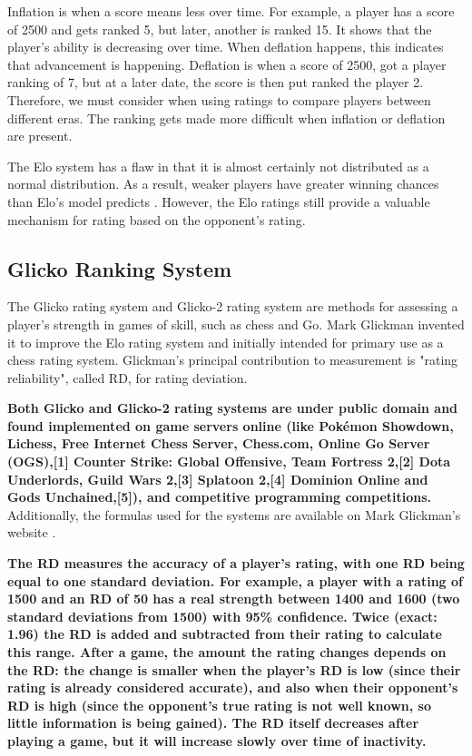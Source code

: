 	
	Inflation is when a score means less over time. For example, a player has a score of 2500 and gets ranked 5, but later, another is ranked 15. It shows that the player's ability is decreasing over time. When deflation happens, this indicates that advancement is happening. Deflation is when a score of 2500, got a player ranking of 7, but at a later date, the score is then put ranked the player 2. Therefore, we must consider when using ratings to compare players between different eras. The ranking gets made more difficult when inflation or deflation are present. %
	
	The Elo system has a flaw in that it is almost certainly not distributed as a normal distribution. As a result, weaker players have greater winning chances than Elo's model predicts \cite{weng2011bayesian}. However, the Elo ratings still provide a valuable mechanism for rating based on the opponent's rating.
	
	\subsection{Glicko Ranking System}
	The Glicko rating system \cite{glickman1995glicko} and Glicko-2 rating system \cite{glickman2012example} are methods for assessing a player's strength in games of skill, such as chess and Go. Mark Glickman invented it to improve the Elo rating system and initially intended for primary use as a chess rating system. Glickman's principal contribution to measurement is "rating reliability", called RD, for rating deviation.
	
	\textbf{Both Glicko and Glicko-2 rating systems are under public domain and found implemented on game servers online (like Pokémon Showdown, Lichess, Free Internet Chess Server, Chess.com, Online Go Server (OGS),[1] Counter Strike: Global Offensive, Team Fortress 2,[2] Dota Underlords, Guild Wars 2,[3] Splatoon 2,[4] Dominion Online and Gods Unchained,[5]), and competitive programming competitions.} Additionally, the formulas used for the systems are available on Mark Glickman's website \cite{glickman_website}.

	\textbf{The RD measures the accuracy of a player's rating, with one RD being equal to one standard deviation. For example, a player with a rating of 1500 and an RD of 50 has a real strength between 1400 and 1600 (two standard deviations from 1500) with 95\% confidence. Twice (exact: 1.96) the RD is added and subtracted from their rating to calculate this range. After a game, the amount the rating changes depends on the RD: the change is smaller when the player's RD is low (since their rating is already considered accurate), and also when their opponent's RD is high (since the opponent's true rating is not well known, so little information is being gained). The RD itself decreases after playing a game, but it will increase slowly over time of inactivity.}
	

